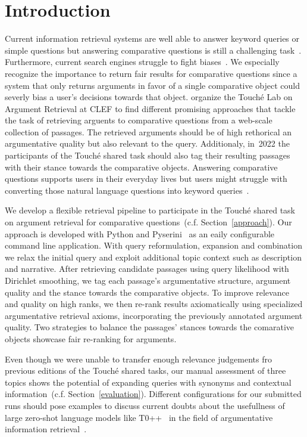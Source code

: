 \section{Introduction}\label{intro}

Current information retrieval systems are well able to answer keyword queries or simple questions but answering comparative questions is still a challenging task~\cite{BondarenkoGFBAPBSWPH2021}.
Furthermore, current search engines struggle to fight biases~\cite{ShahB2022}.
We especially recognize the importance to return fair results for comparative questions since a system that only returns arguments in favor of a single comparative object could severly bias a user's decisions towards that object.
\citet{BondarenkoFKSGBPBSWPH2022} organize the Touché Lab on Argument Retrieval at CLEF to find different promising approaches that tackle the task of retrieving arguents to comparative questions from a web-scale collection of passages.
The retrieved arguments should be of high rethorical an argumentative quality but also relevant to the query.
Additionaly, in~2022 the participants of the Touché shared task should also tag their resulting passages with their stance towards the comparative objects.
Answering comparative questions supports users in their everyday lives but users might struggle with converting those natural language questions into keyword queries~\cite{BondarenkoGFBAPBSWPH2021}.

We develop a flexible retrieval pipeline to participate in the Touché shared task on argument retrieval for comparative questions~(c.f. Section~\ref{approach}).
Our approach is developed with Python and Pyserini~\cite{LinMLYPN2021} as an eaily configurable command line application.
With query reformulation, expansion and combination we relax the initial query and exploit additional topic context such as description and narrative.
After retrieving candidate passages using query likelihood with Dirichlet smoothing, we tag each passage's argumentative structure, argument quality and the stance towards the comparative objects.
To improve relevance and quality on high ranks, we then re-rank results axiomatically using specialized argumentative retrieval axioms, incorporating the previously annotated argument quality.
Two strategies to balance the passages' stances towards the comarative objects showcase fair re-ranking for arguments.

Even though we were unable to transfer enough relevance judgements fro previous editions of the Touché shared tasks, our manual assessment of three topics shows the potential of expanding queries with synonyms and contextual information~(c.f. Section~\ref{evaluation}).
Different configurations for our submitted runs should pose examples to discuss current doubts about the usefullness of large zero-shot language models like T0++~\cite{SanhWRBSACSLRDBXTSSKCNDCJWMSYPBWNRSSFFTBGBWR2021} in the field of argumentative information retrieval~\cite{ShahB2022}.
